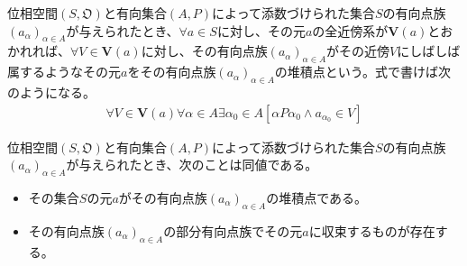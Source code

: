 \documentclass[dvipdfmx]{jsarticle}
\begin{document}
\begin{dfn}
位相空間$\left( S,\mathfrak{O} \right)$と有向集合$(A,P)$によって添数づけられた集合$S$の有向点族$\left( a_{\alpha} \right)_{\alpha \in A}$が与えられたとき、$\forall a \in S$に対し、その元$a$の全近傍系が$\mathbf{V}(a)$とおかれれば、$\forall V \in \mathbf{V}(a)$に対し、その有向点族$\left( a_{\alpha} \right)_{\alpha \in A}$がその近傍$V$にしばしば属するようなその元$a$をその有向点族$\left( a_{\alpha} \right)_{\alpha \in A}$の堆積点という。式で書けば次のようになる。
\begin{align*}
\forall V \in \mathbf{V}(a)\forall\alpha \in A\exists\alpha_{0} \in A\left[ \alpha P\alpha_{0} \land a_{\alpha_{0}} \in V \right]
\end{align*}
\end{dfn}
\begin{thm}\label{8.1.9.5}
位相空間$\left( S,\mathfrak{O} \right)$と有向集合$(A,P)$によって添数づけられた集合$S$の有向点族$\left( a_{\alpha} \right)_{\alpha \in A}$が与えられたとき、次のことは同値である。
\begin{itemize}
\item
  その集合$S$の元$a$がその有向点族$\left( a_{\alpha} \right)_{\alpha \in A}$の堆積点である。
\item
  その有向点族$\left( a_{\alpha} \right)_{\alpha \in A}$の部分有向点族でその元$a$に収束するものが存在する。
\end{itemize}
\end{thm}
\end{document}
